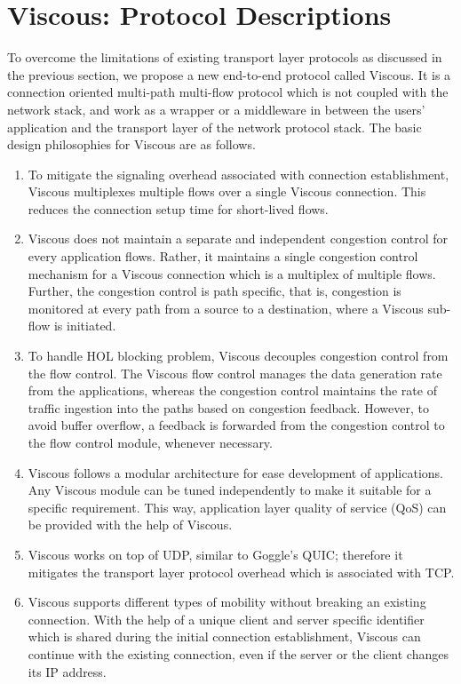 \section{Viscous: Protocol Descriptions}
To overcome the limitations of existing transport layer protocols as discussed in the previous section, we propose a new end-to-end protocol called Viscous. It is a connection oriented multi-path multi-flow protocol which is not coupled with the network stack, and work as a wrapper or a middleware in between the users' application and the transport layer of the network protocol stack. The basic design philosophies for Viscous are as follows. 
\begin{enumerate}
	\item To mitigate the signaling overhead associated with connection establishment, Viscous multiplexes multiple flows over a single Viscous connection. This reduces the connection setup time for short-lived flows. 
	\item Viscous does not maintain a separate and independent congestion control for every application flows. Rather, it maintains a single congestion control mechanism for a Viscous connection which is a multiplex of multiple flows. Further, the congestion control is path specific, that is, congestion is monitored at every path from a source to a destination, where a Viscous sub-flow is initiated.  
	\item To handle HOL blocking problem, Viscous decouples congestion control from the flow control. The Viscous flow control manages the data generation rate from the applications, whereas the congestion control maintains the rate of traffic ingestion into the paths based on congestion feedback. However, to avoid buffer overflow, a feedback is forwarded from the congestion control to the flow control module, whenever necessary.
	\item Viscous follows a modular architecture for ease development of applications. Any Viscous module can be tuned independently to make it suitable for a specific requirement. This way, application layer quality of service (QoS) can be provided with the help of Viscous. 
	\item Viscous works on top of UDP, similar to Goggle's QUIC; therefore it mitigates the transport layer protocol overhead which is associated with TCP. 
	\item Viscous supports different types of mobility without breaking an existing connection. With the help of a unique client and server specific identifier which is shared during the initial connection establishment, Viscous can continue with the existing connection, even if the server or the client changes its IP address.   
\end{enumerate}

